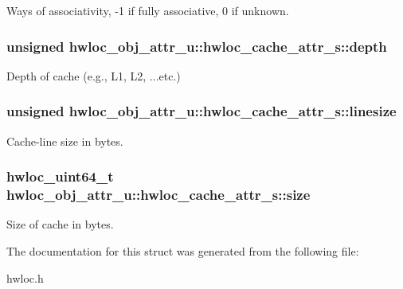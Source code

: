 Ways of associativity, -\/1 if fully associative, 0 if unknown. 

\hypertarget{a00013_a5c8f7f39193736c2187ed626940835d5}{
\subsubsection[{depth}]{\setlength{\rightskip}{0pt plus 5cm}unsigned {\bf hwloc\_\-obj\_\-attr\_\-u::hwloc\_\-cache\_\-attr\_\-s::depth}}}
\label{a00013_a5c8f7f39193736c2187ed626940835d5}


Depth of cache (e.g., L1, L2, ...etc.) 

\hypertarget{a00013_a801e8a668e28caf06c8b88e9ae5c10db}{
\subsubsection[{linesize}]{\setlength{\rightskip}{0pt plus 5cm}unsigned {\bf hwloc\_\-obj\_\-attr\_\-u::hwloc\_\-cache\_\-attr\_\-s::linesize}}}
\label{a00013_a801e8a668e28caf06c8b88e9ae5c10db}


Cache-\/line size in bytes. 

\hypertarget{a00013_abe5e788943ed04302976740c829674c0}{
\subsubsection[{size}]{\setlength{\rightskip}{0pt plus 5cm}hwloc\_\-uint64\_\-t {\bf hwloc\_\-obj\_\-attr\_\-u::hwloc\_\-cache\_\-attr\_\-s::size}}}
\label{a00013_abe5e788943ed04302976740c829674c0}


Size of cache in bytes. 



The documentation for this struct was generated from the following file:\begin{DoxyCompactItemize}
\item 
hwloc.h\end{DoxyCompactItemize}
